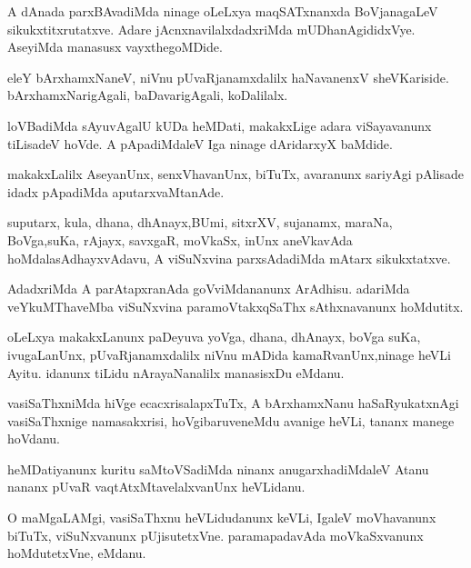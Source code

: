 \documentclass{article}
\begin{document}
\begin{mn}
A dAnada parxBAvadiMda ninage oLeLxya maqSATxnanxda BoVjanagaLeV sikukxtitxrutatxve.  
Adare jAcnxnavilalxdadxriMda  mUDhanAgididxVye.  AseyiMda manasusx vayxthegoMDide.
\end{mn}

\begin{mn}
eleY bArxhamxNaneV, niVnu pUvaRjanamxdalilx  haNavanenxV sheVKariside. 
bArxhamxNarigAgali, baDavarigAgali, koDalilalx.
\end{mn}

\begin{mn}
loVBadiMda sAyuvAgalU  kUDa heMDati,  makakxLige adara viSayavanunx 
tiLisadeV hoVde. A pApadiMdaleV Iga ninage dAridarxyX  baMdide.
\end{mn}

\begin{mn}
makakxLalilx AseyanUnx, senxVhavanUnx, biTuTx, avaranunx sariyAgi pAlisade 
idadx pApadiMda aputarxvaMtanAde.
\end{mn}

\begin{mn}
suputarx, kula, dhana, dhAnayx,BUmi, sitxrXV, sujanamx, maraNa, BoVga,suKa, 
rAjayx, savxgaR, moVkaSx, inUnx aneVkavAda hoMdalasAdhayxvAdavu, A viSuNxvina 
parxsAdadiMda mAtarx sikukxtatxve.
\end{mn}

\begin{mn}
AdadxriMda A parAtapxranAda goVviMdananunx ArAdhisu. adariMda veYkuMThaveMba 
viSuNxvina paramoVtakxqSaThx sAthxnavanunx hoMdutitx.
\end{mn}

\begin{mn}
oLeLxya makakxLanunx paDeyuva yoVga, dhana, dhAnayx, boVga suKa, ivugaLanUnx, 
pUvaRjanamxdalilx niVnu mADida kamaRvanUnx,ninage heVLi Ayitu.  idanunx 
tiLidu nArayaNanalilx manasisxDu eMdanu.
\end{mn}

\begin{mn}
vasiSaThxniMda hiVge ecacxrisalapxTuTx, A bArxhamxNanu haSaRyukatxnAgi 
vasiSaThxnige namasakxrisi, hoVgibaruveneMdu avanige heVLi, tananx manege hoVdanu.
\end{mn}

\begin{mn}
heMDatiyanunx kuritu saMtoVSadiMda ninanx anugarxhadiMdaleV Atanu nananx 
pUvaR vaqtAtxMtavelalxvanUnx heVLidanu.
\end{mn}

\begin{mn}
O maMgaLAMgi, vasiSaThxnu heVLidudanunx keVLi,  IgaleV moVhavanunx biTuTx, 
viSuNxvanunx  pUjisutetxVne. paramapadavAda moVkaSxvanunx hoMdutetxVne, eMdanu.
\end{mn}
\end{document}
